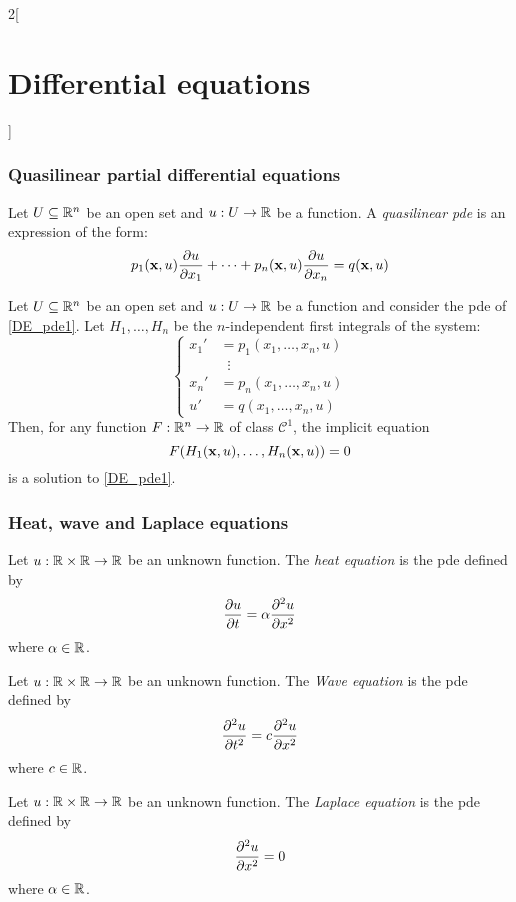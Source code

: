\documentclass[../../../main.tex]{subfiles}
\begin{document}
\begin{multicols}{2}[\section{Differential equations}]
  \subsubsection{Quasilinear partial differential equations}
  \begin{definition}
    Let $U\subseteq \mathbb{R}^n$ be an open set and $u:U\rightarrow\mathbb{R}$ be a function. A \emph{quasilinear pde} is an expression of the form:
    \begin{equation}\label{DE_pde1}
      p_1(\boldsymbol{\mathrm{x}},u)\pdv{u}{x_1}+\cdots+p_n(\boldsymbol{\mathrm{x}},u)\pdv{u}{x_n}=q(\boldsymbol{\mathrm{x}},u)
    \end{equation}
  \end{definition}
  \begin{theorem}
    Let $U\subseteq \mathbb{R}^n$ be an open set and $u:U\rightarrow\mathbb{R}$ be a function and consider the pde of \cref{DE_pde1}. Let $H_1,\ldots,H_{n}$ be the $n$-independent first integrals of the system:
    $$
      \left\{
      \begin{aligned}
        {x_1}' & =p_1(x_1,\ldots,x_n,u) \\
               & \;\;\vdots             \\
        {x_n}' & =p_n(x_1,\ldots,x_n,u) \\
        {u}'   & = q(x_1,\ldots,x_n,u)
      \end{aligned}
      \right.
    $$
    Then, for any function $F:\mathbb{R}^n\rightarrow\mathbb{R}$ of class $\mathcal{C}^1$, the implicit equation $$F(H_1(\boldsymbol{\mathrm{x}},u),\ldots,H_n(\boldsymbol{\mathrm{x}},u))=0$$ is a solution to \cref{DE_pde1}.
  \end{theorem}
  \subsubsection{Heat, wave and Laplace equations}
  \begin{definition}
    Let $u:\mathbb{R}\times\mathbb{R}\rightarrow\mathbb{R}$ be an unknown function. The \emph{heat equation} is the pde defined by $$\pdv{u}{t}=\alpha\pdv[2]{u}{x}$$ where $\alpha\in\mathbb{R}$.
  \end{definition}
  \begin{definition}
    Let $u:\mathbb{R}\times\mathbb{R}\rightarrow\mathbb{R}$ be an unknown function. The \emph{Wave equation} is the pde defined by $$\pdv[2]{u}{t}=c\pdv[2]{u}{x}$$ where $c\in\mathbb{R}$.
  \end{definition}
  \begin{definition}
    Let $u:\mathbb{R}\times\mathbb{R}\rightarrow\mathbb{R}$ be an unknown function. The \emph{Laplace equation} is the pde defined by $$\pdv[2]{u}{x}=0$$ where $\alpha\in\mathbb{R}$.
  \end{definition}
\end{multicols}
\end{document}
